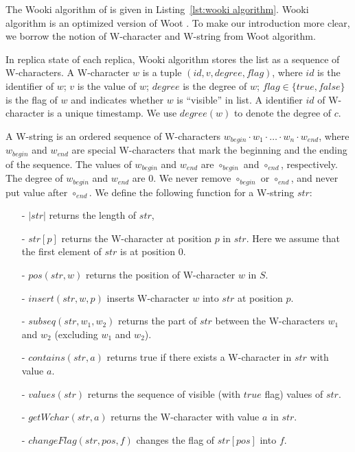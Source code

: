 The Wooki algorithm of \cite{DBLP:conf/wise/WeissUM07} is given in Listing~\ref{lst:wooki algorithm}. %
Wooki algorithm is an optimized version of Woot \cite{DBLP:conf/cscw/OsterUMI06}. To make our introduction more clear, we borrow the notion of W-character and W-string from Woot algorithm.

In replica state of each replica, Wooki algorithm stores the list as a sequence of W-characters. A W-character $w$ is a tuple $(id,v,degree,flag)$, where $id$ is the identifier of $w$; $v$ is the value of $w$; $degree$ is the degree of $w$; $flag \in \{ \mathit{true},\mathit{false} \}$ is the flag of $w$ and indicates whether $w$ is ``visible'' in list. A identifier $id$ of W-character is a unique timestamp. %
We use $degree(w)$ to denote the degree of $c$.

A W-string is an ordered sequence of W-characters $w_{begin} \cdot w_1 \cdot \ldots \cdot w_n \cdot w_{end}$, where $w_{begin}$ and $w_{end}$ are special W-characters that mark the beginning and the ending of the sequence. The values of $w_{begin}$ and $w_{end}$ are $\circ_{begin}$ and $\circ_{end}$, respectively. The degree of $w_{begin}$ and $w_{end}$ are $0$. We never remove $\circ_{begin}$ or $\circ_{end}$, and never put value after $\circ_{end}$. We define the following function for a W-string $str$:

\begin{itemize}
\setlength{\itemsep}{0.5pt}
\item[-] $\vert str \vert$ returns the length of $str$,

\item[-] $str[p]$ returns the W-character at position $p$ in $str$. Here we assume that the first element of $str$ is at position 0.

\item[-] $pos(str,w)$ returns the position of W-character $w$ in $S$.

\item[-] $insert(str,w,p)$ inserts W-character $w$ into $str$ at position $p$.

\item[-] $subseq(str,w_1,w_2)$ returns the part of $str$ between the W-characters $w_1$ and $w_2$ (excluding $w_1$ and $w_2$).

\item[-] $contains(str,a)$ returns true if there exists a W-character in $str$ with value $a$.

\item[-] $values(str)$ returns the sequence of visible (with $\mathit{true}$ flag) values of $str$.

\item[-] $getWchar(str,a)$ returns the W-character with value $a$ in $str$.

\item[-] $changeFlag(str,pos,f)$ changes the flag of $str[pos]$ into $f$.
\end{itemize}

